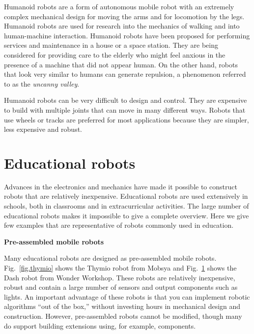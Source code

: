 Humanoid robots are a form of autonomous mobile robot with an extremely complex mechanical design for moving the arms and for locomotion by the legs. Humanoid robots are used for research into the mechanics of walking and into human-machine interaction. Humanoid robots have been proposed for performing services and maintenance in a house or a space station. They are being considered for providing care to the elderly who might feel anxious in the presence of a machine that did not appear human. On the other hand, robots that look very similar to humans can generate repulsion, a phenomenon referred to as the \emph{uncanny valley}.

Humanoid robots can be very difficult to design and control. They are expensive to build with multiple joints that can move in many different ways. Robots that use wheels or tracks are preferred for most applications because they are simpler, less expensive and robust.

\section{Educational robots}\label{s.educational}

Advances in the electronics and mechanics have made it possible to construct robots that are relatively inexpensive. Educational robots are used extensively in schools, both in classrooms and in extracurricular activities. The large number of educational robots makes it impossible to give a complete overview. Here we give few examples that are representative of robots commonly used in education.

\medskip

\noindent\textbf{Pre-assembled mobile robots}

Many educational robots are designed as pre-assembled mobile robots. Fig.~\ref{fig.thymio} shows the Thymio robot from Mobsya and Fig.~\ref{fig.dash} shows the Dash robot from Wonder Workshop. These robots are relatively inexpensive, robust and contain a large number of sensors and output components such as lights. An important advantage of these robots is that you can implement robotic algorithms ``out of the box,'' without investing hours in mechanical design and construction. However, pre-assembled robots cannot be modified, though many do support building extensions using, for example, \lego{} components.

\begin{figure}
\subfigures
\begin{minipage}{\textwidth}
\hspace{\fill}
\label{fig.thymio}
\label{fig.dash}
\end{minipage}
\end{figure}

